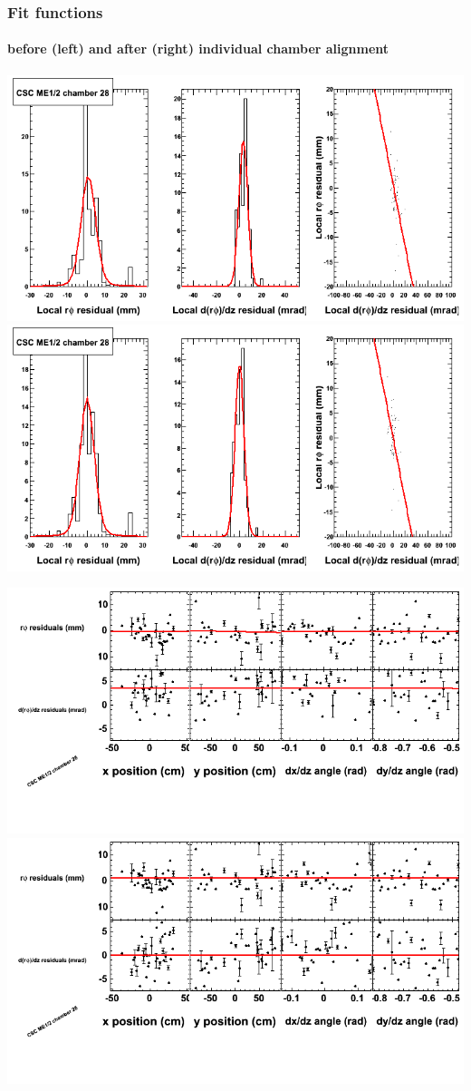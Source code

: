 \documentclass[compress]{beamer}
\begin{document}
\begin{frame}
\frametitle{Fit functions}
\framesubtitle{before (left) and after (right) individual chamber alignment}
\includegraphics[width=0.5\linewidth]{ringfits_3dof/beforefit_MEp12_28_bellcurve.png} \includegraphics[width=0.5\linewidth]{ringfits_3dof/afterfit_MEp12_28_bellcurve.png}

\includegraphics[width=0.5\linewidth]{ringfits_3dof/beforefit_MEp12_28_polynomials.png} \includegraphics[width=0.5\linewidth]{ringfits_3dof/afterfit_MEp12_28_polynomials.png}
\end{frame}
\end{document}
